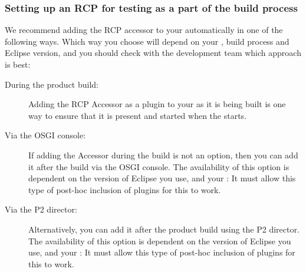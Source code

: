\subsubsection{Setting up an RCP \gdaut{} for testing as a part of the build process}
\label{ToolkitRCPSetupCI}
We recommend adding the RCP accessor to your \gdaut{} automatically in one of the following ways. Which way you choose will depend on your \gdaut{}, build process and Eclipse version, and you should check with the development team which approach is best:

\begin{description}
\item [During the product build:]{Adding the RCP Accessor as a plugin to your \gdaut{} as it is being built is one way to ensure that it is present and started when the \gdaut{} starts.}
\item [Via the OSGI console:]{If adding the Accessor during the build is not an option, then you can add it after the build via the OSGI console. The availability of this option is dependent on the version of Eclipse you use, and your \gdaut{}: It must allow this type of post-hoc inclusion of plugins for this to work.}
\item [Via the P2 director:]{Alternatively, you can add it after the product build using the P2 director. The availability of this option is dependent on the version of Eclipse you use, and your \gdaut{}: It \gdaut{} must allow this type of post-hoc inclusion of plugins for this to work.}
\end{description}
